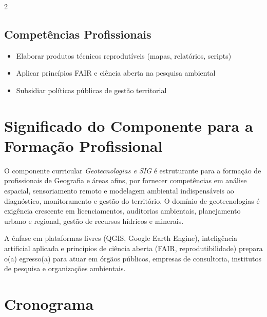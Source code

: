 \documentclass[11pt,a4paper]{article}
\begin{document}
\begin{multicols}{2}
\begin{itemize}
\end{itemize}

\subsection*{Competências Profissionais}

\begin{itemize}

\item Elaborar produtos técnicos reprodutíveis (mapas, relatórios, scripts)

\item Aplicar princípios FAIR e ciência aberta na pesquisa ambiental

\item Subsidiar políticas públicas de gestão territorial

\end{itemize}

\end{multicols}

\section*{Significado do Componente para a Formação Profissional}

O componente curricular \textit{Geotecnologias e SIG} é estruturante para a formação de profissionais de Geografia e áreas afins, por fornecer competências em análise espacial, sensoriamento remoto e modelagem ambiental indispensáveis ao diagnóstico, monitoramento e gestão do território. O domínio de geotecnologias é exigência crescente em licenciamentos, auditorias ambientais, planejamento urbano e regional, gestão de recursos hídricos e minerais.

A ênfase em plataformas livres (QGIS, Google Earth Engine), inteligência artificial aplicada e princípios de ciência aberta (FAIR, reprodutibilidade) prepara o(a) egresso(a) para atuar em órgãos públicos, empresas de consultoria, institutos de pesquisa e organizações ambientais.

\section*{Cronograma}
\end{document}
